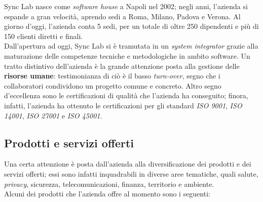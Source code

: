 Sync Lab nasce come \textit{software house} a Napoli nel 2002; negli anni, l'azienda si espande a gran velocità, aprendo sedi a Roma, Milano, Padova e Verona. Al giorno d'oggi, l'azienda conta 5 sedi, per un totale di oltre 250 dipendenti e più di 150 clienti diretti e finali. \\
Dall'apertura ad oggi, Sync Lab si è tramutata in un \textit{system integrator} grazie alla maturazione delle competenze tecniche e metodologiche in ambito software. Un tratto distintivo dell'azienda è la grande attenzione posta alla gestione delle \textbf{risorse umane}: testimonianza di ciò è il basso \textit{turn-over}, segno che i collaboratori condividono un progetto comune e concreto.
Altro segno d'eccellenza sono le certificazioni di qualità che l'azienda ha conseguito; finora, infatti, l'azienda ha ottenuto le certificazioni per gli standard \textit{ISO 9001}, \textit{ISO 14001}, \textit{ISO 27001} e \textit{ISO 45001}.

\subsection*{Prodotti e servizi offerti}

Una certa attenzione è posta dall'azienda alla diversificazione dei prodotti e dei servizi offerti; essi sono infatti inquadrabili in diverse aree tematiche, quali salute, \textit{privacy}, sicurezza, telecomunicazioni, finanza, territorio e ambiente. \\
Alcuni dei prodotti che l'azienda offre al momento sono i seguenti:

